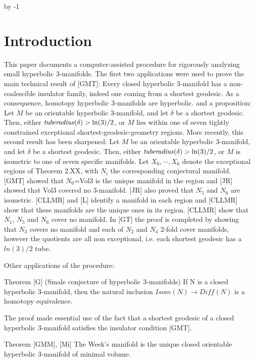 \def\Arccosh{{\rm Arccosh}}
\advance\sectioncount by -1
\section{Introduction}

This paper documents a computer-assisted procedure
for rigorously analyzing small hyperbolic $3$-manifolds.
The first two applications were used to prove
the main technical result of [GMT]:
Every closed hyperbolic $3$-manifold
has a non-coalescible insulator family,
indeed one coming from a shortest geodesic.
As a consequence,
homotopy hyperbolic $3$-manifolds are hyperbolic.
\endproclaim
and a proposition:
Let $M$ be an orientable hyperbolic $3$-manifold, and let $\delta$ be
a shortest geodesic. Then, either ${\it tuberadius}(\delta) > \ln(3)/2$,
or $M$ lies within one of seven tightly constrained
exceptional shortest-geodesic-geometry regions.
\endproclaim
More recently, this second result has been sharpened:
Let $M$ be an orientable hyperbolic $3$-manifold,
and let $\delta$ be a shortest geodesic.
Then, either ${\it tuberadius}(\delta) > \ln(3)/2$, or
$M$ is isometric to one of seven specific manifolds.
\endproclaim
{}
Let $X_0, \cdots, X_6$ denote the exceptional regions of Theorem 2.XX,
with $N_i$ the corresponding conjectural manifold.
[GMT] showed that $N_0$=Vol3 is the unique manifold in the region
and [JR] showed that Vol3 covered no 3-manifold.
[JR] also proved that $N_5$ and $N_6$ are isometric.
[CLLMR] and [L] identify a manifold in each region
and [CLLMR] show that these manifolds are the unique ones in its region.
[CLLMR] show that $N_1$, $N_5$ and $N_6$ cover no manifold.
In [GT] the proof is completed by showing that $N_3$ covers no manifold
and each of $N_2$ and $N_4$ 2-fold cover manifolds,
however the quotients are all non exceptional,
i.e. each shortest geodesic has a $ln(3)/2$ tube.
\enddemo

Other applications of the procedure:

Theorem [G]  (Smale conjecture of hyperbolic 3-manifolds)
If N is a closed hyperbolic 3-manifold,
then the natural inclusion $Isom(N)\to Diff(N)$ is a homotopy equivalence.

The proof made essential use of the fact that a shortest geodesic
of a closed hyperbolic 3-manifold satisfies the insulator condition [GMT].

Theorem [GMM], [Mi] The Week's manifold
is the unique closed orientable hyperbolic 3-manifold of minimal volume.

